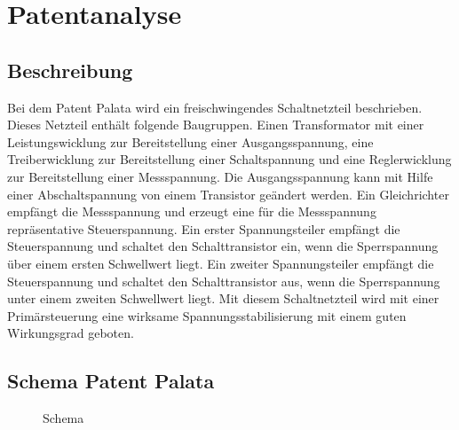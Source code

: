 \section{Patentanalyse}\label{sec:Patentanalyse}
\subsection{Beschreibung}\label{subsec:Beschreibung}
Bei dem Patent Palata wird ein freischwingendes Schaltnetzteil beschrieben. Dieses Netzteil enthält folgende Baugruppen. Einen Transformator mit einer Leistungswicklung zur Bereitstellung einer Ausgangsspannung, eine Treiberwicklung zur Bereitstellung einer Schaltspannung und eine Reglerwicklung zur Bereitstellung einer Messspannung. Die Ausgangsspannung kann mit Hilfe einer Abschaltspannung von einem Transistor geändert werden. Ein Gleichrichter empfängt die Messspannung und erzeugt eine für die Messspannung repräsentative Steuerspannung. Ein erster Spannungsteiler empfängt die Steuerspannung und schaltet den Schalttransistor ein, wenn die Sperrspannung über einem ersten Schwellwert liegt. Ein zweiter Spannungsteiler empfängt die Steuerspannung und schaltet den Schalttransistor aus, wenn die Sperrspannung unter einem zweiten Schwellwert liegt. Mit diesem Schaltnetzteil wird mit einer Primärsteuerung eine wirksame Spannungsstabilisierung mit einem guten Wirkungsgrad geboten.


\subsection{Schema Patent Palata}\label{subsec:Schema}
\begin{figure}[h!]
	\centering
{}
	\caption{Schema}
	\label{fig:Schema}
\end{figure} 
\newpage
